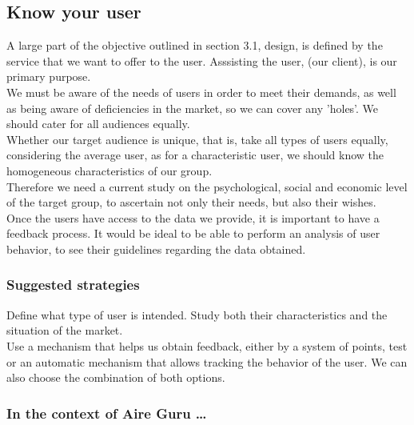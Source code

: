\subsection{Know your user}

A large part of the objective outlined in section 3.1, design, is defined by the service that we want to offer
to the user. Asssisting the user, (our client), is our primary purpose. \\

We must be aware of the needs of users in order to meet their demands, as well as being aware of deficiencies in the market, so we can cover any 'holes'.
We should cater for all audiences equally.\\

Whether our target audience is unique, that is, take all types of users equally, considering the
average user, as for a characteristic user, we should know the homogeneous characteristics of our group.\\

Therefore we need a current study on the psychological, social and economic level of the target group, to ascertain not only
their needs, but also their wishes.\\

Once the users have access to the data we provide, it is important to have a feedback process.
It would be ideal to be able to perform an analysis of user behavior, to see their guidelines regarding the data obtained.

\subsubsection*{Suggested strategies} 

Define what type of user is intended. Study both their characteristics and the situation of the
market.\\
Use a mechanism that helps us obtain feedback, either by a system of points, test or
an automatic mechanism that allows tracking the behavior of the user. We can also choose the combination of both
options.

\subsubsection*{In the context of Aire Guru \ldots}

